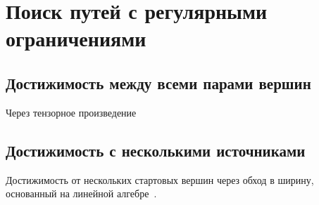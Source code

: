 \chapter{Поиск путей с регулярными ограничениями}

\section{Достижимость между всеми парами вершин}

Через тензорное произведение

\section{Достижимость с несколькими источниками}

Достижимость от нескольких стартовых вершин через обход в ширину, основанный на линейной алгебре~\cite{9286186}.

